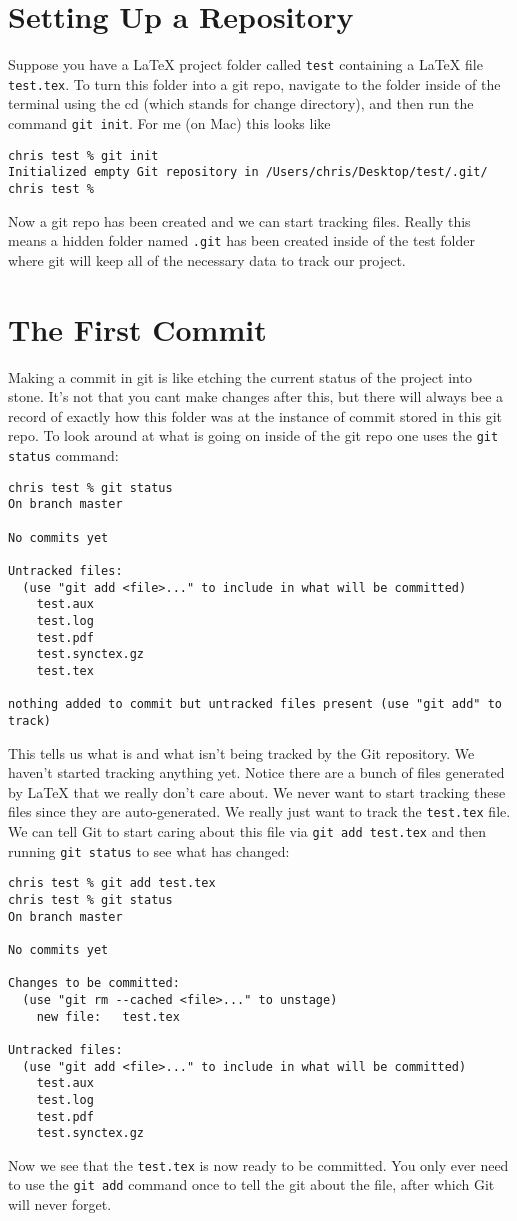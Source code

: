 \documentclass{article}
\begin{document}
\section{Setting Up a Repository}
Suppose you have a LaTeX project folder called \lstinline{test}
containing a LaTeX file \lstinline{test.tex}. To turn this folder into
a git repo, navigate to the folder inside of the terminal using the cd
(which stands for change directory), and then run the command
\lstinline{git init}. For me (on Mac) this looks like
\begin{lstlisting}
chris test % git init 
Initialized empty Git repository in /Users/chris/Desktop/test/.git/
chris test % 
\end{lstlisting}
Now a git repo has been created and we can start tracking
files. Really this means a hidden folder named \lstinline{.git} has
been created inside of the test folder where git will keep all of the
necessary data to track our project.
\section{The First Commit}
Making a commit in git is like etching the current status of the
project into stone. It's not that you cant make changes after this,
but there will always bee a record of exactly how this folder was at
the instance of commit stored in this git repo. To look around at what
is going on inside of the git repo one uses the \lstinline{git status}
command:
\begin{lstlisting}
chris test % git status
On branch master

No commits yet

Untracked files:
  (use "git add <file>..." to include in what will be committed)
	test.aux
	test.log
	test.pdf
	test.synctex.gz
	test.tex

nothing added to commit but untracked files present (use "git add" to track)
\end{lstlisting}
This tells us what is and what isn't being tracked by the Git
repository. We haven't started tracking anything yet. Notice there are
a bunch of files generated by LaTeX that we really don't care
about. We never want to start tracking these files since they are
auto-generated. We really just want to track the \lstinline{test.tex}
file. We can tell Git to start caring about this file via
\lstinline{git add test.tex} and then running \lstinline{git status}
to see what has changed:
\begin{lstlisting}
chris test % git add test.tex 
chris test % git status
On branch master

No commits yet

Changes to be committed:
  (use "git rm --cached <file>..." to unstage)
	new file:   test.tex

Untracked files:
  (use "git add <file>..." to include in what will be committed)
	test.aux
	test.log
	test.pdf
	test.synctex.gz
\end{lstlisting}
Now we see that the \lstinline{test.tex} is now ready to be
committed. You only ever need to use the \lstinline{git add} command
once to tell the git about the file, after which Git will never
forget.
\end{document}
